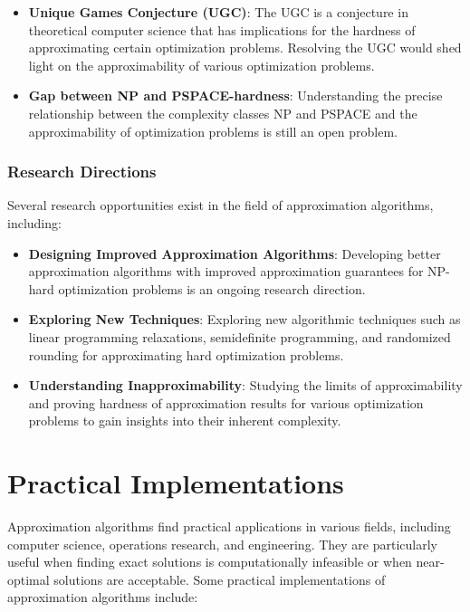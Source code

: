 \documentclass[12pt]{book} %
\begin{document}
\begin{itemize}
    \item \textbf{Unique Games Conjecture (UGC)}: The UGC is a conjecture in theoretical computer science that has implications for the hardness of approximating certain optimization problems. Resolving the UGC would shed light on the approximability of various optimization problems.
    
    \item \textbf{Gap between NP and PSPACE-hardness}: Understanding the precise relationship between the complexity classes NP and PSPACE and the approximability of optimization problems is still an open problem.
\end{itemize}

\subsubsection{Research Directions}
Several research opportunities exist in the field of approximation algorithms, including:

\begin{itemize}
    \item \textbf{Designing Improved Approximation Algorithms}: Developing better approximation algorithms with improved approximation guarantees for NP-hard optimization problems is an ongoing research direction.
    
    \item \textbf{Exploring New Techniques}: Exploring new algorithmic techniques such as linear programming relaxations, semidefinite programming, and randomized rounding for approximating hard optimization problems.
    
    \item \textbf{Understanding Inapproximability}: Studying the limits of approximability and proving hardness of approximation results for various optimization problems to gain insights into their inherent complexity.
\end{itemize}



\section{Practical Implementations}

Approximation algorithms find practical applications in various fields, including computer science, operations research, and engineering. They are particularly useful when finding exact solutions is computationally infeasible or when near-optimal solutions are acceptable. Some practical implementations of approximation algorithms include:
\end{document}
